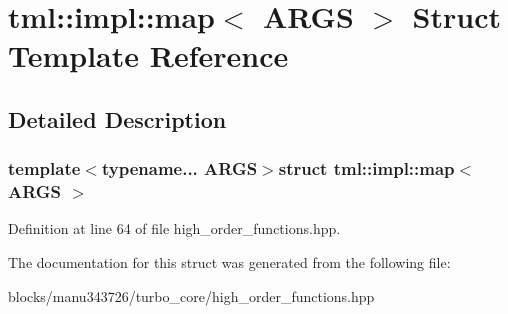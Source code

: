 \hypertarget{structtml_1_1impl_1_1map}{\section{tml\+:\+:impl\+:\+:map$<$ A\+R\+G\+S $>$ Struct Template Reference}
\label{structtml_1_1impl_1_1map}
}


\subsection{Detailed Description}
\subsubsection*{template$<$typename... A\+R\+G\+S$>$struct tml\+::impl\+::map$<$ A\+R\+G\+S $>$}



Definition at line 64 of file high\+\_\+order\+\_\+functions.\+hpp.



The documentation for this struct was generated from the following file\+:\begin{DoxyCompactItemize}
\item 
blocks/manu343726/turbo\+\_\+core/high\+\_\+order\+\_\+functions.\+hpp\end{DoxyCompactItemize}
